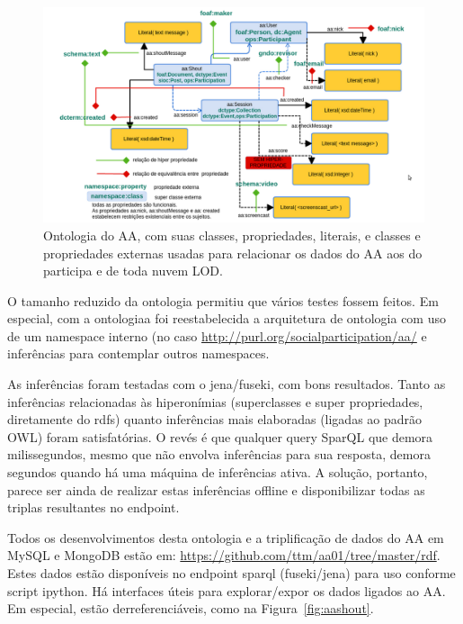 \documentclass[12pt]{article}
\begin{document}
\begin{figure}[h!]
  \centering
    \includegraphics[width=\textwidth]{../figs/ontologiaa.png}
  \caption{Ontologia do AA, com suas classes, propriedades, literais, e classes e propriedades externas usadas para relacionar os dados do AA aos do participa e de toda nuvem LOD.}\label{fig:diaa}
\end{figure}

O tamanho reduzido da ontologia permitiu que vários testes fossem feitos. Em especial, com a ontologiaa foi reestabelecida a arquitetura de ontologia com uso de um namespace interno (no caso \url{http://purl.org/socialparticipation/aa/} e inferências para contemplar outros namespaces.

As inferências foram testadas com o jena/fuseki, com bons resultados. Tanto as inferências relacionadas às hiperonímias (superclasses e super propriedades, diretamente do rdfs) quanto inferências mais elaboradas (ligadas ao padrão OWL) foram satisfatórias. O revés é que qualquer query SparQL que demora milissegundos, mesmo que não envolva inferências para sua resposta, demora segundos quando há uma máquina de inferências ativa. A solução, portanto, parece ser ainda de realizar estas inferências offline e disponibilizar todas as triplas resultantes no endpoint.

Todos os desenvolvimentos desta ontologia e a triplificação de dados do AA em MySQL e MongoDB estão em: \url{https://github.com/ttm/aa01/tree/master/rdf}. Estes dados estão disponíveis no endpoint sparql (fuseki/jena) para uso conforme script ipython. Há interfaces úteis para explorar/expor os dados ligados ao AA. Em especial, estão derreferenciáveis, como na Figura~\ref{fig:aashout}.
\end{document}

